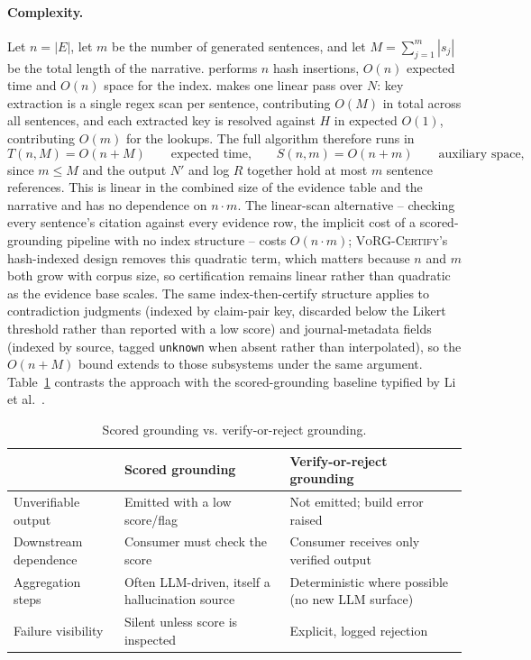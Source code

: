 \documentclass[11pt]{article}
\begin{document}
\paragraph{Complexity.} Let $n = |E|$, let $m$ be the number of generated sentences, and let $M = \sum_{j=1}^m |s_j|$ be the total length of the narrative.  performs $n$ hash insertions, $O(n)$ expected time and $O(n)$ space for the index.  makes one linear pass over $N$: key extraction is a single regex scan per sentence, contributing $O(M)$ in total across all sentences, and each extracted key is resolved against $H$ in expected $O(1)$, contributing $O(m)$ for the lookups. The full algorithm therefore runs in
\[
T(n, M) = O(n + M) \qquad \text{expected time,} \qquad S(n, m) = O(n + m) \qquad \text{auxiliary space,}
\]
since $m \le M$ and the output $N'$ and log $R$ together hold at most $m$ sentence references. This is linear in the combined size of the evidence table and the narrative and has no dependence on $n \cdot m$. The linear-scan alternative -- checking every sentence's citation against every evidence row, the implicit cost of a scored-grounding pipeline with no index structure -- costs $O(n \cdot m)$; \textsc{VoRG-Certify}'s hash-indexed design removes this quadratic term, which matters because $n$ and $m$ both grow with corpus size, so certification remains linear rather than quadratic as the evidence base scales. The same index-then-certify structure applies to contradiction judgments (indexed by claim-pair key, discarded below the Likert threshold rather than reported with a low score) and journal-metadata fields (indexed by source, tagged \texttt{unknown} when absent rather than interpolated), so the $O(n+M)$ bound extends to those subsystems under the same argument. Table~\ref{tab:contrast} contrasts the approach with the scored-grounding baseline typified by Li et al.~\cite{li2025enhancing}.

\begin{table}[h]
\centering
\caption{Scored grounding vs. verify-or-reject grounding.}
\label{tab:contrast}
\begin{tabular}{@{}p{3.6cm}p{5.3cm}p{5.3cm}@{}}
\toprule
& \textbf{Scored grounding} & \textbf{Verify-or-reject grounding} \\
\midrule
Unverifiable output & Emitted with a low score/flag & Not emitted; build error raised \\
Downstream dependence & Consumer must check the score & Consumer receives only verified output \\
Aggregation steps & Often LLM-driven, itself a hallucination source & Deterministic where possible (no new LLM surface) \\
Failure visibility & Silent unless score is inspected & Explicit, logged rejection \\
\bottomrule
\end{tabular}
\end{table}
\end{document}
